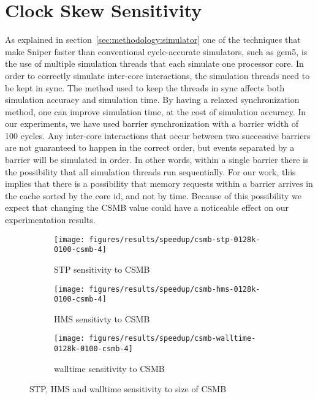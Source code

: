 
\section{Clock Skew Sensitivity}
\label{sec:results:csmb_sensitivity}

As explained in section~\ref{sec:methodology:simulator} one of the techniques that make Sniper faster than conventional cycle-accurate simulators, such as gem5, is the use of multiple simulation threads that each simulate one processor core.
In order to correctly simulate inter-core interactions, the simulation threads need to be kept in sync.
The method used to keep the threads in sync affects both simulation accuracy and simulation time.
By having a relaxed synchronization method, one can improve simulation time, at the cost of simulation accuracy.
In our experiments, we have used barrier synchronization with a barrier width of 100 cycles.
Any inter-core interactions that occur between two successive barriers are not guaranteed to happen in the correct order, but events separated by a barrier will be simulated in order.
In other words, within a single barrier there is the possibility that all simulation threads run sequentially.
For our work, this implies that there is a possibility that memory requests within a barrier arrives in the cache sorted by the core id, and not by time.
Because of this possibility we expect that changing the CSMB value could have a noticeable effect on our experimentation results.

\begin{figure}[!htb]
    \centering
    \begin{subfigure}[b]{0.5\textwidth}
        \texttt{[image: figures/results/speedup/csmb-stp-0128k-0100-csmb-4]}
        \caption{STP sensitivity to CSMB}
        \label{fig:results:csmb:stp}
    \end{subfigure}%
    \begin{subfigure}[b]{0.5\textwidth}
        \texttt{[image: figures/results/speedup/csmb-hms-0128k-0100-csmb-4]}
        \caption{HMS sensitivty to CSMB}
        \label{fig:results:csmb:hms}
    \end{subfigure}
    \begin{subfigure}[b]{0.6\textwidth}
        \texttt{[image: figures/results/speedup/csmb-walltime-0128k-0100-csmb-4]}
        \caption{walltime sensitivity to CSMB}
        \label{fig:results:csmb:mpki}
    \end{subfigure}
    \caption{STP, HMS and walltime sensitivity to size of CSMB}
    \label{fig:results:csmb}
\end{figure}



